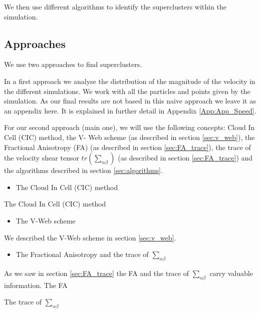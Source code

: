 \documentclass[12pt]{article}
\begin{document}
We then use different algorithms to identify the
 superclusters within the simulation.\\

\subsection{Approaches} \label{sec:approaches}
We use two approaches to find superclusters. 
\begin{par}
In a first approach we analyse the distribution of
 the magnitude of the velocity in the different
  simulations. We work with all the particles and
   points given by the simulation. As our final
    results are not based in this naive approach
     we leave it as an appendix here. It is
      explained in further detail in Appendix
       \ref{App:App_Speed}.\\
\end{par}

\begin{par}
For our second approach (main one), we will use the
 following concepts: Cloud In Cell (CIC) method, the V-
 Web scheme (as described in section \ref{sec:v_web}),
  the Fractional Anisotropy (FA) (as described in
   section \ref{sec:FA_trace}), the trace of the
    velocity shear tensor $tr\left(\sum_{\alpha
     \beta}\right)$ (as described in section
      \ref{sec:FA_trace}) and the algorithms described
       in section \ref{sec:algorithms}.\\
\end{par}


\begin{itemize}
\item The Cloud In Cell (CIC) method
\end{itemize}
\begin{par}
The Cloud In Cell (CIC) method\\
\end{par}

\begin{itemize}
\item The V-Web scheme
\end{itemize}
\begin{par}
We described the V-Web scheme in section \ref{sec:v_web}.\\ %
\end{par}

\begin{itemize}
\item The Fractional Anisotropy and the trace of $\sum_{\alpha \beta}$
\end{itemize}
\begin{par}
As we saw in section \ref{sec:FA_trace} the FA and the trace of $\sum_{\alpha \beta}$ carry valuable information.
The FA %

The trace of $\sum_{\alpha \beta}$\\  %
\end{par}
\end{document}
